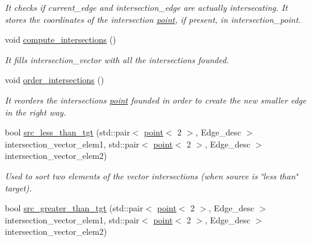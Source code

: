 \begin{DoxyCompactItemize}
\begin{DoxyCompactList}\small\item\em It checks if current\_\-edge and intersection\_\-edge are actually intersecating. It stores the coordinates of the intersection \hyperlink{classpoint}{point}, if present, in intersection\_\-point. \item\end{DoxyCompactList}\item 
\hypertarget{classintersector__Formaggia_a362e2c771e923d0abe0e29920ca2d1cc}{
void \hyperlink{classintersector__Formaggia_a362e2c771e923d0abe0e29920ca2d1cc}{compute\_\-intersections} ()}
\label{classintersector__Formaggia_a362e2c771e923d0abe0e29920ca2d1cc}

\begin{DoxyCompactList}\small\item\em It fills intersection\_\-vector with all the intersections founded. \item\end{DoxyCompactList}\item 
\hypertarget{classintersector__Formaggia_abb2e1e954c66f8ac2ea791f63d5bbdfa}{
void \hyperlink{classintersector__Formaggia_abb2e1e954c66f8ac2ea791f63d5bbdfa}{order\_\-intersections} ()}
\label{classintersector__Formaggia_abb2e1e954c66f8ac2ea791f63d5bbdfa}

\begin{DoxyCompactList}\small\item\em It reorders the intersections \hyperlink{classpoint}{point} founded in order to create the new smaller edge in the right way. \item\end{DoxyCompactList}\item 
\hypertarget{classintersector__Formaggia_aecd55534299fac6f538fdb77dab00959}{
bool \hyperlink{classintersector__Formaggia_aecd55534299fac6f538fdb77dab00959}{src\_\-less\_\-than\_\-tgt} (std::pair$<$ \hyperlink{classpoint}{point}$<$ 2 $>$, Edge\_\-desc $>$ intersection\_\-vector\_\-elem1, std::pair$<$ \hyperlink{classpoint}{point}$<$ 2 $>$, Edge\_\-desc $>$ intersection\_\-vector\_\-elem2)}
\label{classintersector__Formaggia_aecd55534299fac6f538fdb77dab00959}

\begin{DoxyCompactList}\small\item\em Used to sort two elements of the vector intersections (when source is \char`\"{}less than\char`\"{} target). \item\end{DoxyCompactList}\item 
\hypertarget{classintersector__Formaggia_ac0e8a94b417dde2d27c3a1429b01f0b0}{
bool \hyperlink{classintersector__Formaggia_ac0e8a94b417dde2d27c3a1429b01f0b0}{src\_\-greater\_\-than\_\-tgt} (std::pair$<$ \hyperlink{classpoint}{point}$<$ 2 $>$, Edge\_\-desc $>$ intersection\_\-vector\_\-elem1, std::pair$<$ \hyperlink{classpoint}{point}$<$ 2 $>$, Edge\_\-desc $>$ intersection\_\-vector\_\-elem2)}
\label{classintersector__Formaggia_ac0e8a94b417dde2d27c3a1429b01f0b0}


\end{DoxyCompactItemize}
